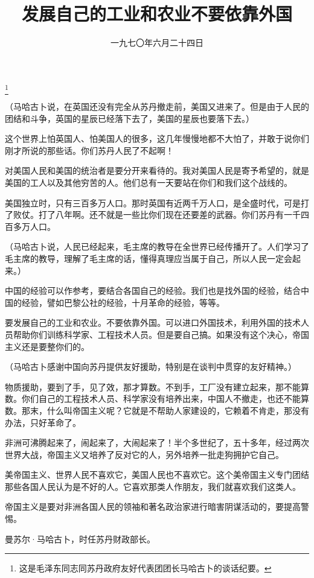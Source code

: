 
\title{发展自己的工业和农业不要依靠外国}
\date{一九七〇年六月二十四日}
\thanks{这是毛泽东同志同苏丹政府友好代表团团长马哈古卜的谈话纪要。}
\maketitle


（马哈古卜说，在英国还没有完全从苏丹撤走前，美国又进来了。但是由于人民的团结和斗争，英国的星辰已经落下去了，美国的星辰也要落下去。）

这个世界上怕英国人、怕美国人的很多，这几年慢慢地都不大怕了，并敢于说你们刚才所说的那些话。你们苏丹人民了不起啊！

对美国人民和美国的统治者是要分开来看待的。我对美国人民是寄予希望的，就是美国的工人以及其他穷苦的人。他们总有一天要站在你们和我们这个战线的。

美国独立时，只有三百多万人口。那时英国有近两千万人口，是全盛时代，可是打了败仗。打了八年啊。还不就是一些比你们现在还要差的武器。你们苏丹有一千四百多万人口。

（马哈古卜说，人民已经起来，毛主席的教导在全世界已经传播开了。人们学习了毛主席的教导，理解了毛主席的话，懂得真理应当属于自己，所以人民一定会起来。）

中国的经验可以作参考，要结合各国自己的经验。我们也是找外国的经验，结合中国的经验，譬如巴黎公社的经验，十月革命的经验，等等。

要发展自己的工业和农业。不要依靠外国。可以进口外国技术，利用外国的技术人员帮助你们训练科学家、工程技术人员。但是要自己搞。如果没有这个决心，帝国主义还是要整你们的。

（马哈古卜感谢中国向苏丹提供友好援助，特别是在谈判中贯穿的友好精神。）

物质援助，要到了手，见了效，那才算数。不到手，工厂没有建立起来，那不能算数。你们自己的工程技术人员、科学家没有培养出来，中国人不撤走，也还不能算数。那末，什么叫帝国主义呢？它就是不帮助人家建设的，它赖着不肯走，那没有办法，只好革命了。

非洲可沸腾起来了，闹起来了，大闹起来了！半个多世纪了，五十多年，经过两次世界大战，帝国主义又培养了反对它的人，另外培养一批走狗拥护它自己。

美帝国主义、世界人民不喜欢它，美国人民也不喜欢它。这个美帝国主义专门团结那些各国人民认为是不好的人。它喜欢那类人作朋友，我们就喜欢我们这类人。

帝国主义是要对非洲各国人民的领袖和著名政治家进行暗害阴谋活动的，要提高警惕。

\begin{maonote}
曼苏尔·马哈古卜，时任苏丹财政部长。
\end{maonote}
